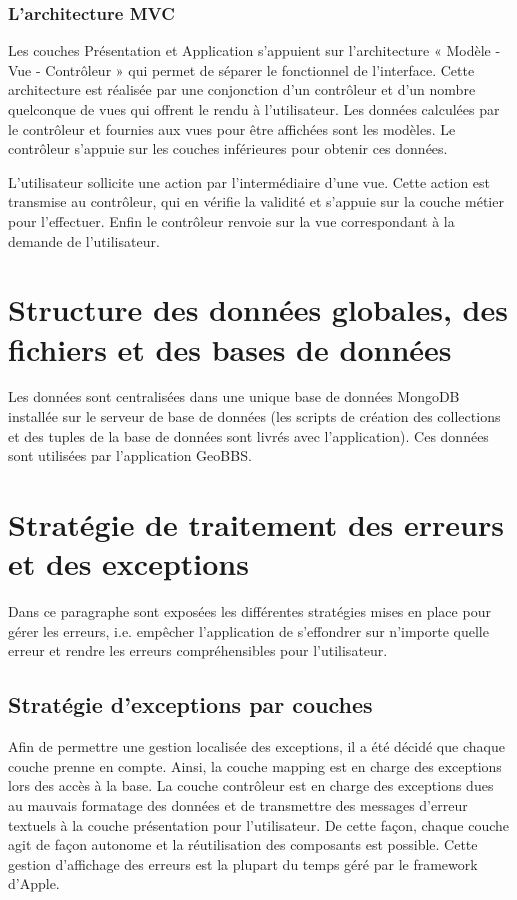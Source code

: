 \documentclass[a4paper,12pt]{report}
\begin{document}
\begin{onehalfspace}
\subsection*{L'architecture MVC} %
\label{ssub:l_architecture_mvc}
Les couches Présentation et Application s’appuient  sur l’architecture « Modèle - Vue - Contrôleur » qui permet de séparer le fonctionnel de l’interface. Cette architecture est réalisée par une conjonction d’un contrôleur et d’un nombre quelconque de vues qui offrent le rendu à l’utilisateur. Les données calculées par le contrôleur et fournies aux vues pour être affichées sont les modèles. Le contrôleur s’appuie  sur les couches inférieures pour obtenir ces données.

L'utilisateur sollicite une action par l’intermédiaire d’une vue. Cette action est transmise au contrôleur, qui en vérifie la validité et s’appuie sur la couche métier pour l’effectuer. Enfin le contrôleur renvoie sur la vue correspondant à la demande de l’utilisateur.

\chapter{Structure des données globales, des fichiers et des bases de données} %
  Les données sont centralisées dans une unique base de données MongoDB installée sur le serveur de base de données (les scripts de création des collections et des tuples de la base de données sont livrés avec l’application). Ces données sont utilisées par l’application GeoBBS.

\chapter{Stratégie de traitement des erreurs et des exceptions}
  Dans ce paragraphe sont exposées les différentes stratégies mises en place pour gérer les erreurs, i.e. empêcher l’application de s’effondrer sur n’importe quelle erreur et rendre les erreurs compréhensibles pour l’utilisateur.

\section{Stratégie d’exceptions par couches}
  Afin de permettre une gestion localisée des exceptions, il a été décidé que chaque couche prenne en compte. Ainsi, la couche mapping est en charge des exceptions lors des accès à la base. La couche contrôleur est en charge des exceptions dues au mauvais formatage des données et de transmettre des messages d’erreur textuels à la couche présentation pour l’utilisateur. De cette façon, chaque couche agit de façon autonome et la réutilisation des composants est possible. Cette gestion d'affichage des erreurs est la plupart du temps géré par le framework d'Apple.


\end{onehalfspace}
\end{document}
